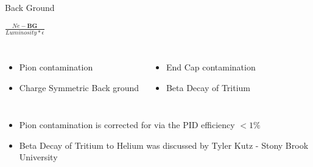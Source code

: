 \documentclass{beamer}
\begin{document}
\begin{frame}{Back Ground}
	\begin{block}{$\frac{Ne - \textbf{BG} }{Luminosity *  \epsilon}$}
		\begin{columns}
			\begin{itemize}
				\item Pion contamination
				\item Charge Symmetric Back ground
			\end{itemize}
			\begin{itemize}
				\item End Cap contamination
   				\item Beta Decay of Tritium
   			\end{itemize}
		\end{columns}	
		\begin{itemize}
			\item Pion contamination is corrected for via the PID efficiency  $ < 1\%$ 
			\item Beta Decay of Tritium to Helium was discussed by Tyler Kutz - Stony Brook University 
		\end{itemize}		
	\end{block}
\end{frame}
\end{document}

